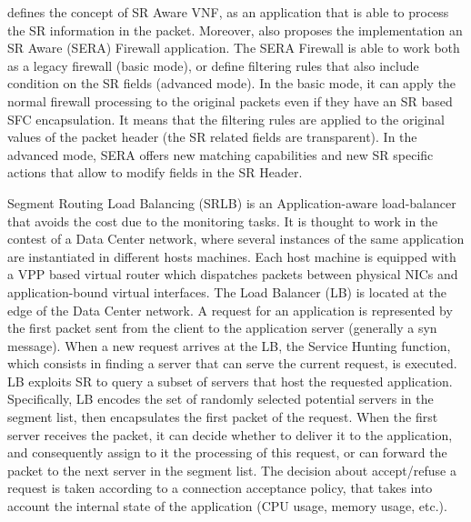 \cite{abdelsalam2018sera} defines the concept of SR Aware VNF, as an application that is able to process the SR information in the packet.
Moreover, \cite{abdelsalam2018sera} also proposes the implementation an SR Aware (SERA) Firewall application.
The SERA Firewall is able to work both as a legacy firewall (basic mode), or define filtering rules that also include condition on the SR fields (advanced mode).
In the basic mode, it can apply the normal firewall processing to the original packets even if they have an SR based SFC encapsulation.
It means that the filtering rules are applied to the original values of the packet header (the SR related fields are transparent).
In the advanced mode, SERA offers new matching capabilities and new SR specific actions that allow to modify fields in the SR Header. 

Segment Routing Load Balancing (SRLB) \cite{srlb} is an Application-aware load-balancer that avoids the cost due to the monitoring tasks.
It is thought to work in the contest of a Data Center network, where several instances of the same application are instantiated in different hosts machines.
Each host machine is equipped with a VPP based virtual router which dispatches packets between physical NICs and application-bound virtual interfaces.
The Load Balancer (LB) is located at the edge of the Data Center network.
A request for an application is represented by the first packet sent from the client to the application server (generally a syn message). 
When a new request arrives at the LB, the Service Hunting function, which consists in finding a server that can serve the current request, is executed.
LB exploits SR to query a subset of servers that host the requested application.
Specifically, LB encodes the set of randomly selected potential servers in the segment list, then encapsulates the first packet of the request.
When the first server receives the packet, it can decide whether to deliver it to the application, and consequently assign to it the processing of this request, or can forward the packet to the next server in the segment list.
The decision about accept/refuse a request is taken according to a connection acceptance policy, that takes into account the internal state of the application (CPU usage, memory usage, etc.).


